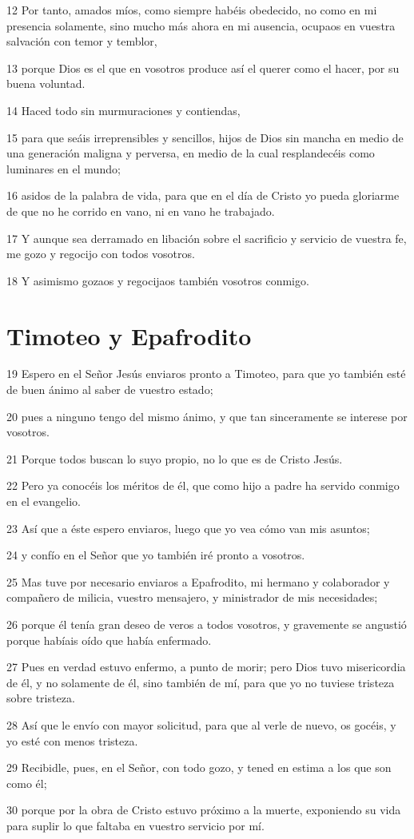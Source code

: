 \par 12 Por tanto, amados míos, como siempre habéis obedecido, no como en mi presencia solamente, sino mucho más ahora en mi ausencia, ocupaos en vuestra salvación con temor y temblor,
\par 13 porque Dios es el que en vosotros produce así el querer como el hacer, por su buena voluntad.
\par 14 Haced todo sin murmuraciones y contiendas,
\par 15 para que seáis irreprensibles y sencillos, hijos de Dios sin mancha en medio de una generación maligna y perversa, en medio de la cual resplandecéis como luminares en el mundo;
\par 16 asidos de la palabra de vida, para que en el día de Cristo yo pueda gloriarme de que no he corrido en vano, ni en vano he trabajado.
\par 17 Y aunque sea derramado en libación sobre el sacrificio y servicio de vuestra fe, me gozo y regocijo con todos vosotros.
\par 18 Y asimismo gozaos y regocijaos también vosotros conmigo.

\section*{Timoteo y Epafrodito}

\par 19 Espero en el Señor Jesús enviaros pronto a Timoteo, para que yo también esté de buen ánimo al saber de vuestro estado;
\par 20 pues a ninguno tengo del mismo ánimo, y que tan sinceramente se interese por vosotros.
\par 21 Porque todos buscan lo suyo propio, no lo que es de Cristo Jesús.
\par 22 Pero ya conocéis los méritos de él, que como hijo a padre ha servido conmigo en el evangelio.
\par 23 Así que a éste espero enviaros, luego que yo vea cómo van mis asuntos;
\par 24 y confío en el Señor que yo también iré pronto a vosotros.
\par 25 Mas tuve por necesario enviaros a Epafrodito, mi hermano y colaborador y compañero de milicia, vuestro mensajero, y ministrador de mis necesidades;
\par 26 porque él tenía gran deseo de veros a todos vosotros, y gravemente se angustió porque habíais oído que había enfermado.
\par 27 Pues en verdad estuvo enfermo, a punto de morir; pero Dios tuvo misericordia de él, y no solamente de él, sino también de mí, para que yo no tuviese tristeza sobre tristeza.
\par 28 Así que le envío con mayor solicitud, para que al verle de nuevo, os gocéis, y yo esté con menos tristeza.
\par 29 Recibidle, pues, en el Señor, con todo gozo, y tened en estima a los que son como él;
\par 30 porque por la obra de Cristo estuvo próximo a la muerte, exponiendo su vida para suplir lo que faltaba en vuestro servicio por mí.

